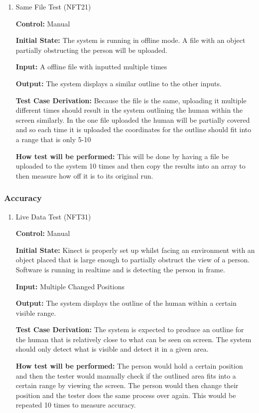 \documentclass[12pt, titlepage]{article}
\begin{document}
\begin{enumerate}

\item{Same File Test (NFT21)\\}
  
\textbf{Control:} Manual

\textbf{Initial State:} The system is running in offline mode. A file with an object partially obstructing the person will be uploaded.

\textbf{Input:} A offline file with inputted multiple times

\textbf{Output:} The system displays a similar outline to the other inputs.

\textbf{Test Case Derivation:} Because the file is the same, uploading it multiple different times should result in the system outlining the human within the screen similarly. In the one file uploaded the human will be partially covered and so each time it is uploaded the coordinates for the outline should fit into a range that is only 5-10%

\textbf{How test will be performed:} This will be done by having a file be uploaded to the system 10 times and then copy the results into an array to then measure how off it is to its original run. 
  
\end{enumerate}

\subsubsection{Accuracy}

\begin{enumerate}

\item{Live Data Test (NFT31)\\}

\textbf{Control:} Manual

\textbf{Initial State:} Kinect is properly set up whilst facing an environment with an object placed that is large enough to partially obstruct the view of a person. Software is running in realtime and is detecting the person in frame.

\textbf{Input:} Multiple Changed Positions

\textbf{Output:} The system displays the outline of the human within a certain visible range.

\textbf{Test Case Derivation:} The system is expected to produce an outline for the human that is relatively close to what can be seen on screen. The system should only detect what is visible and detect it in a given area.

\textbf{How test will be performed:} The person would hold a certain position and then the tester would manually check if the outlined area fits into a certain range by viewing the screen. The person would then change their position and the tester does the same process over again. This would be repeated 10 times to measure accuracy.
  
\end{enumerate}
\end{document}
